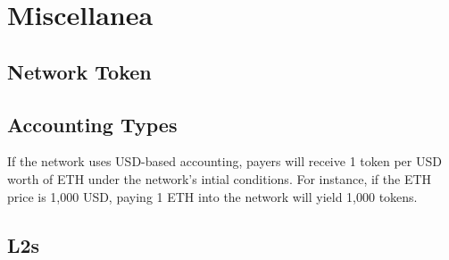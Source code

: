 \documentclass{article}
\begin{document}
\section{Miscellanea}

\subsection{Network Token}

\subsection{Accounting Types}\label{sec:accounting_types}

If the network uses USD-based accounting, payers will receive 1 token per USD worth of ETH under the network's intial conditions. For instance, if the ETH price is 1,000 USD, paying 1 ETH into the network will yield 1,000 tokens.

\subsection{L2s}

% 
% 
\end{document}
